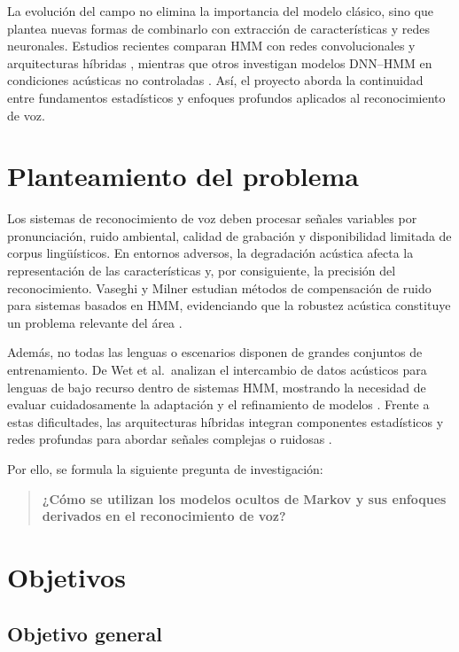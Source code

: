 \documentclass[12pt,a4paper]{article}
\begin{document}
La evolución del campo no elimina la importancia del modelo clásico, sino que plantea nuevas formas de combinarlo con extracción de características y redes neuronales. Estudios recientes comparan HMM con redes convolucionales y arquitecturas híbridas \cite{Santos2025}, mientras que otros investigan modelos DNN--HMM en condiciones acústicas no controladas \cite{Shanthamallappa2026}. Así, el proyecto aborda la continuidad entre fundamentos estadísticos y enfoques profundos aplicados al reconocimiento de voz.

\section{Planteamiento del problema}

Los sistemas de reconocimiento de voz deben procesar señales variables por pronunciación, ruido ambiental, calidad de grabación y disponibilidad limitada de corpus lingüísticos. En entornos adversos, la degradación acústica afecta la representación de las características y, por consiguiente, la precisión del reconocimiento. Vaseghi y Milner estudian métodos de compensación de ruido para sistemas basados en HMM, evidenciando que la robustez acústica constituye un problema relevante del área \cite{Vaseghi1997}.

Además, no todas las lenguas o escenarios disponen de grandes conjuntos de entrenamiento. De Wet et al.\ analizan el intercambio de datos acústicos para lenguas de bajo recurso dentro de sistemas HMM, mostrando la necesidad de evaluar cuidadosamente la adaptación y el refinamiento de modelos \cite{DeWet2017}. Frente a estas dificultades, las arquitecturas híbridas integran componentes estadísticos y redes profundas para abordar señales complejas o ruidosas \cite{GodvinMani2025,Shanthamallappa2026}.

Por ello, se formula la siguiente pregunta de investigación:

\begin{quote}
\textbf{¿Cómo se utilizan los modelos ocultos de Markov y sus enfoques derivados en el reconocimiento de voz?}
\end{quote}

\section{Objetivos}

\subsection{Objetivo general}
\end{document}
